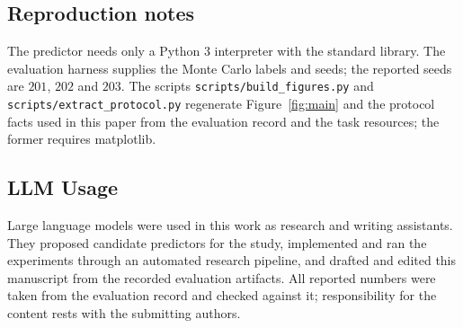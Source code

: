 \documentclass{article}
\begin{document}
\subsection{Reproduction notes}
The predictor needs only a Python 3 interpreter with the standard library. The evaluation harness supplies the Monte Carlo labels and seeds; the reported seeds are $201$, $202$ and $203$. The scripts \texttt{scripts/build\_figures.py} and \texttt{scripts/extract\_protocol.py} regenerate Figure~\ref{fig:main} and the protocol facts used in this paper from the evaluation record and the task resources; the former requires matplotlib. %

\subsection{LLM Usage}
Large language models were used in this work as research and writing assistants. They proposed candidate predictors for the study, implemented and ran the experiments through an automated research pipeline, and drafted and edited this manuscript from the recorded evaluation artifacts. All reported numbers were taken from the evaluation record and checked against it; responsibility for the content rests with the submitting authors.
\end{document}
